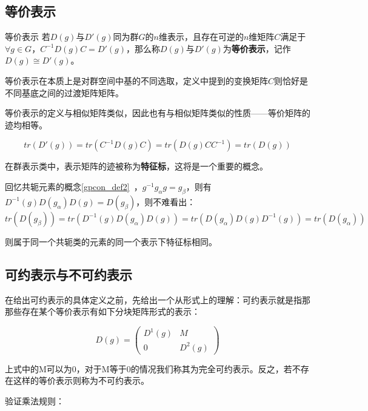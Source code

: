 


\subsection{等价表示}
\begin{definition}{等价表示}
若$D(g)$与$D'(g)$同为群$G$的$n$维表示，且存在可逆的$n$维矩阵$C$满足于$\forall g\in G$，$C^{-1}D(g)C=D'(g)$，那么称$D(g)$与$D'(g)$为\textbf{等价表示}，记作$D(g)\cong D'(g)$。
\end{definition}

等价表示在本质上是对群空间中基的不同选取，定义中提到的变换矩阵$C$则恰好是不同基底之间的过渡矩阵矩阵。

等价表示的定义与相似矩阵类似，因此也有与相似矩阵类似的性质——等价矩阵的迹均相等。

$$tr(D'(g))=tr(C^{-1}D(g)C)=tr(D(g)CC^{-1})=tr(D(g))$$

在群表示类中，表示矩阵的迹被称为\textbf{特征标}，这将是一个重要的概念。

回忆共轭元素的概念\autoref{gpcon_def2}~，$g^{-1}g_\alpha g=g_\beta$，则有$D^{-1}(g)D(g_\alpha)D(g)=D(g_\beta)$，则不难看出：
$$tr(D(g_\beta))=tr(D^{-1}(g)D(g_\alpha)D(g))=tr(D(g_\alpha)D(g)D^{-1}(g))=tr(D(g_\alpha))$$

则属于同一个共轭类的元素的同一个表示下特征标相同。


\subsection{可约表示与不可约表示}

在给出可约表示的具体定义之前，先给出一个从形式上的理解：可约表示就是指那那些存在某个等价表示有如下分块矩阵形式的表示：

\begin{equation}
D(g)=\begin{pmatrix}
 D^1(g) & M\\
 0 & D^2(g)
\end{pmatrix}
\end{equation}

上式中的M可以为0，对于M等于0的情况我们称其为完全可约表示。反之，若不存在这样的等价表示则称为不可约表示。

验证乘法规则：

